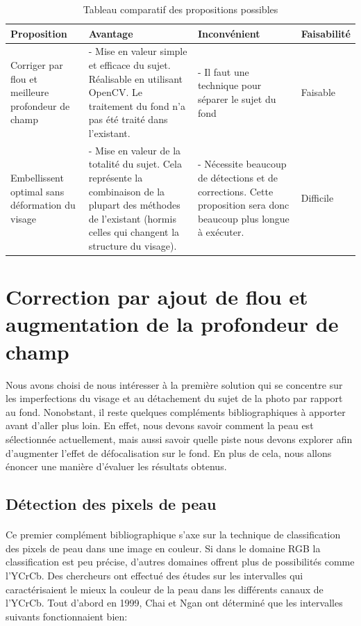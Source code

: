 \documentclass[11pt, french]{report-rd-info}
\begin{document}
\begin{table}
\begin{center}
\begin{tabular}{|p{3cm}|p{4cm}|p{4cm}|p{2.5cm}|}
\hline
Proposition & Avantage & Inconvénient & Faisabilité \\ \hline
Corriger par flou et meilleure profondeur de champ & - Mise en valeur simple et efficace du sujet. Réalisable en utilisant OpenCV. Le traitement du fond n'a pas été traité dans l'existant. & - Il faut une technique pour séparer le sujet du fond & Faisable \\ \hline
Embellissent optimal sans déformation du visage & - Mise en valeur de la totalité du sujet. Cela représente la combinaison de la plupart des méthodes de l'existant (hormis celles qui changent la structure du visage). & - Nécessite beaucoup de détections et de corrections. Cette proposition sera donc beaucoup plus longue à exécuter. & Difficile \\ \hline
\end{tabular}
\end{center}
\caption{Tableau comparatif des propositions possibles}
\label{tab:compprop}
\end{table}






\section{Correction par ajout de flou et augmentation de la profondeur de champ}
Nous avons choisi de nous intéresser à la première solution qui se concentre sur les imperfections du visage et au détachement du sujet de la photo par rapport au fond. Nonobstant, il reste quelques compléments bibliographiques à apporter avant d'aller plus loin. En effet, nous devons savoir comment la peau est sélectionnée actuellement, mais aussi savoir quelle piste nous devons explorer afin d'augmenter l'effet de défocalisation sur le fond. En plus de cela, nous allons énoncer une manière d'évaluer les résultats obtenus.


\subsection{Détection des pixels de peau}
\label{part:detectionpeau}
\paragraph*{}
Ce premier complément bibliographique s'axe sur la technique de classification des pixels de peau dans une image en couleur. Si dans le domaine RGB la classification est peu précise, d'autres domaines offrent plus de possibilités comme l’YCrCb. Des chercheurs ont effectué des études sur les intervalles qui caractérisaient le mieux la couleur de la peau dans les différents canaux de l'YCrCb. Tout d'abord en 1999, Chai et Ngan \cite{Chai1999} ont déterminé que les intervalles suivants fonctionnaient bien: 
\end{document}
